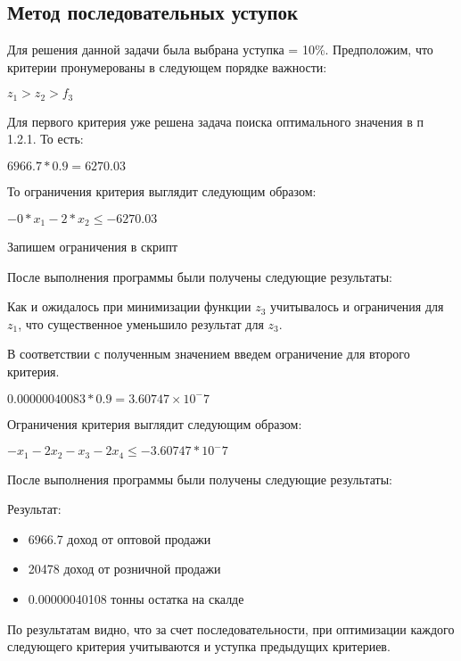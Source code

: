 \documentclass[14pt,a4paper,report]{report}
\begin{document}
\subsection{Метод последовательных уступок}
Для решения данной задачи была выбрана уступка = 10\%. 	Предположим, что критерии пронумерованы в следующем порядке важности:
\begin{center}
$z_1>z_2>f_3$
\end{center} 
Для первого критерия уже решена задача поиска оптимального значения в п 1.2.1. То есть:
\begin{center}
$6966.7 * 0.9 = 6270.03$
\end{center}
То ограничения критерия выглядит следующим образом:
\begin{center}
$-0*x_{1}-2*x_{2}\leq -6270.03$
\end{center}


Запишем ограничения в скрипт


После выполнения программы были получены следующие результаты:



Как и ожидалось при минимизации функции $z_3$ учитывалось и ограничения для $z_1$, что существенное уменьшило результат для $z_3$.

В соответствии с полученным значением введем ограничение для второго критерия.

\begin{center}
$ 0.00000040083 * 0.9 = 3.60747 × 10^-7 $
\end{center}

Ограничения критерия выглядит следующим образом:

\begin{center}
$-x_1-2x_2-x_3-2x_4\leq -3.60747 * 10^-7$
\end{center}



После выполнения программы были получены следующие результаты:



Результат:
\begin{itemize}
\item 6966.7 доход от оптовой продажи
\item 20478 доход от розничной продажи
\item 0.00000040108 тонны остатка на скалде
\end{itemize}

По результатам видно, что за счет последовательности, при оптимизации каждого следующего критерия учитываются и уступка предыдущих критериев.
\end{document}
